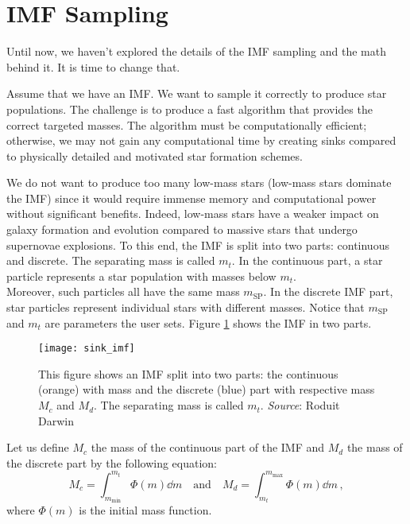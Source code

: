\documentclass[a4paper]{ar-1col-S2O}
\begin{document}
\section{IMF Sampling}
\label{sec:imf_sampling}

Until now, we haven't explored the details of the IMF sampling and the math behind it. It is time to change that. 

Assume that we have an IMF. We want to sample it correctly to produce star populations. The challenge is to produce a fast algorithm that provides the correct targeted masses. The algorithm must be computationally efficient; otherwise, we may not gain any computational time by creating sinks compared to physically detailed and motivated star formation schemes. 

We do not want to produce too many low-mass stars (low-mass stars dominate the IMF) since it would require immense memory and computational power without significant benefits. Indeed, low-mass stars have a weaker impact on galaxy formation and evolution compared to massive stars that undergo supernovae explosions. To this end, the IMF is split into two parts: continuous and discrete. The separating mass is called $m_t$. In the continuous part, a star particle represents a star population with masses below $m_t$. \\
Moreover, such particles all have the same mass $m_{\text{SP}}$. In the discrete IMF part, star particles represent individual stars with different masses. Notice that $m_{\text{SP}}$ and $m_t$ are parameters the user sets. Figure \ref{fig:sink_imf} shows the IMF in two parts.

\begin{figure}[b]
  \texttt{[image: sink\_imf]}
  \caption{This figure shows an IMF split into two parts: the continuous (orange) with mass and the discrete (blue) part with respective mass $M_c$ and $M_d$. The separating mass is called $m_t$. \emph{Source}: Roduit Darwin}
  \label{fig:sink_imf}
\end{figure}

Let us define $M_c$ the mass of the continuous part of the IMF and $M_d$ the mass of the discrete part by the following equation:
%
\begin{equation}
    M_c =  \int_{m_\text{min}}^{m_t} \Phi(m) \dd m \quad \text{and} \quad  M_d =  \int_{m_t}^{m_\text{max}} \Phi(m) \dd m \, ,
\end{equation}
%
where $\Phi(m)$ is the initial mass function. 
\end{document}
